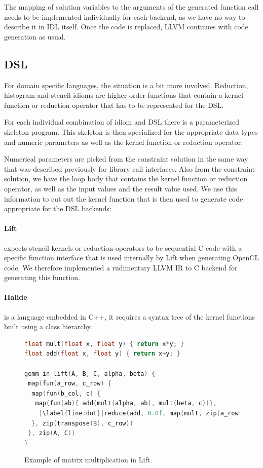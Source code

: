     The mapping of solution variables to the arguments of the generated function
    call needs to be implemented individually for each backend, as we have no
    way to describe it in IDL itself.
    Once the code is replaced, LLVM continues with code generation as usual.

\subsection{DSL}

    For domain specific languages, the situation is a bit more involved.
    Reduction, histogram and stencil idioms are higher order functions that
    contain a kernel function or reduction operator that has to be represented
    for the DSL.

    For each individual combination of idiom and DSL there is a parameterized
    skeleton program.
    This skeleton is then specialized for the appropriate data types and numeric
    parameters as well as the kernel function or reduction operator.

    Numerical parameters are picked from the constraint solution in the same way
    that was described previously for library call interfaces.
    Also from the constraint solution, we have the loop body that contains the
    kernel function or reduction operator, as well as the input values and the
    result value used.
    We use this information to cut out the kernel function that is then used to
    generate code appropriate for the DSL backends:

\paragraph{Lift}  expects stencil kernels or reduction operators to be sequential C code with a specific function interface that
is used internally by Lift when generating OpenCL code.
We therefore implemented a rudimentary LLVM IR to C backend for generating this function.

\paragraph{Halide} is a language embedded in C++, it requires a syntax tree of the kernel functions built using a class hierarchy.

\begin{figure}[ht]
\begin{lstlisting}[language=C,escapechar=|]
float mult(float x, float y) { return x*y; }
float add(float x, float y) { return x+y; }

gemm_in_lift(A, B, C, alpha, beta) {
 map(fun(a_row, c_row) {
  map(fun(b_col, c) {
   map(fun(ab){ add(mult(alpha, ab), mult(beta, c))},
    |\label{line:dot}|reduce(add, 0.0f, map(mult, zip(a_row, b_col))))
  }, zip(transpose(B), c_row))
 }, zip(A, C))
}
\end{lstlisting}
\vspace{-.3cm}
\caption{Example of matrix multiplication in Lift.}
\label{fig:liftmxm}
\vspace{-1em}
\end{figure}

